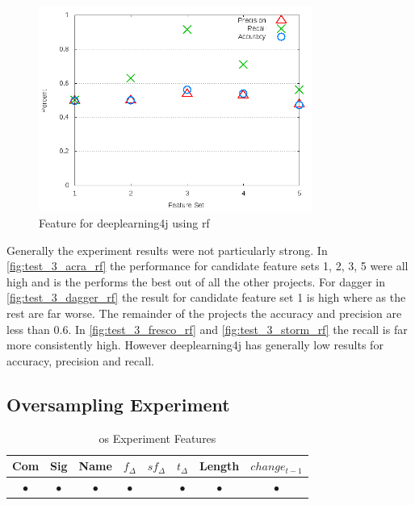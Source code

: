 \begin{figure}[!ht]
    \centering
        \includegraphics[width=0.8\textwidth]{images/rf/test_3/deeplearning4j_sample_range}
    \caption{Feature for deeplearning4j using \gls{rf}}
    \label{fig:test_3_deeplearning4j_rf}
\end{figure}

Generally the experiment results were not particularly strong. In \autoref{fig:test_3_acra_rf} the performance for candidate feature sets 1, 2, 3, 5 were all high and is the performs the best out of all the other projects. For dagger in \autoref{fig:test_3_dagger_rf} the result for candidate feature set 1 is high where as the rest are far worse. The remainder of the projects the accuracy and precision are less than $0.6$. In \autoref{fig:test_3_fresco_rf} and \autoref{fig:test_3_storm_rf} the recall is far more consistently high. However deeplearning4j has generally low results for accuracy, precision and recall.

\subsection{Oversampling Experiment}

\begin{table}[h]
\begin{center}

    \begin{tabular}{|c|c|c|c|c|c|c|c|}
        \hline
        Com & Sig & Name & $f_{\Delta}$ & $sf_{\Delta}$ & $t_\Delta$ & Length & $change_{t-1}$ \\
         \hline
        $\bullet$ & $\bullet$ & $\bullet$ & $\bullet$ & & $\bullet$ & $\bullet$ & $\bullet$ \\ \hline
    \end{tabular}
    \caption{\gls{os} Experiment Features}
    \label{tab:rf_oversampling_features}
\end{center}

\end{table}


